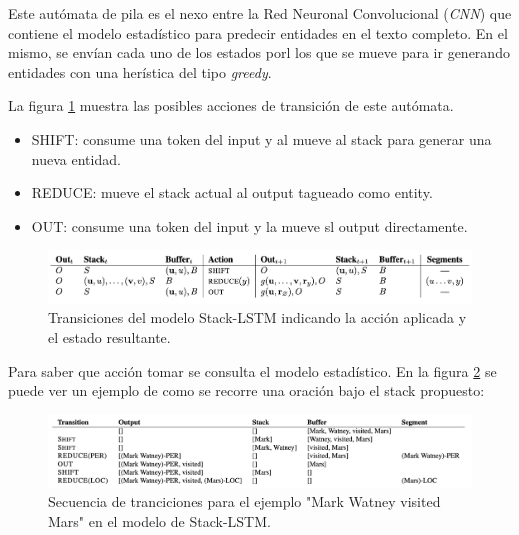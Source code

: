 \documentclass[12pt,a4paper,]{scrartcl}
\providecommand{\tightlist}{%
  \setlength{\itemsep}{0pt}\setlength{\parskip}{0pt}}
\begin{document}
Este autómata de pila es el nexo entre la Red Neuronal Convolucional (\emph{CNN}) que contiene el modelo estadístico para predecir entidades en el texto completo. En el mismo, se envían cada uno de los estados porl los que se mueve para ir generando entidades con una herística del tipo \emph{greedy}.

La figura \ref{fig:lampe-1} muestra las posibles acciones de transición de este autómata.

\begin{itemize}
\tightlist
\item
  SHIFT: consume una token del input y al mueve al stack para generar una nueva entidad.
\item
  REDUCE: mueve el stack actual al output tagueado como entity.
\item
  OUT: consume una token del input y la mueve sl output directamente.
\end{itemize}

\begin{figure}[H]

{\centering \includegraphics{assets/lampe_1.pdf} 

}

\caption{Transiciones del modelo Stack-LSTM indicando la acción aplicada y el estado resultante.}\label{fig:lampe-1}
\end{figure}

Para saber que acción tomar se consulta el modelo estadístico. En la figura \ref{fig:lampe-2} se puede ver un ejemplo de como se recorre una oración bajo el stack propuesto:

\begin{figure}[H]

{\centering \includegraphics{assets/lampe_2.pdf} 

}

\caption{Secuencia de tranciciones para el ejemplo "Mark Watney visited Mars" en el modelo de Stack-LSTM.}\label{fig:lampe-2}
\end{figure}
\end{document}
